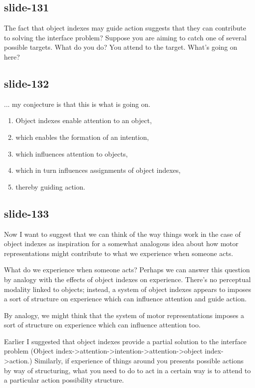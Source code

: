 \documentclass[12pt,\papersize]{extarticle}
\begin{document}
\subsection{slide-131}
The fact that object indexes may guide action suggests that they
can contribute to solving
the interface problem?
Suppose you are aiming to catch one of
several possible targets. What do you do? You attend to the target.
What’s going on here?
 
\subsection{slide-132}
... my conjecture is that this is what is going on.
\begin{enumerate}
\item Object indexes enable attention to an object,
\item which enables the formation of an intention,
\item which influences attention to objects,
\item which in turn influences assignments of object indexes,
\item thereby guiding action.
\end{enumerate}
 
\subsection{slide-133}
Now I want to suggest that we can think of the way things work in the case of
object indexes as inspiration for a somewhat analogous idea about how motor representations
might contribute to what we experience when someone acts.
 
What do we experience when someone acts?
Perhaps we can answer this question by analogy with the effects of object indexes on experience.
There’s no perceptual modality linked to objects; instead, a system of object indexes appears to
imposes a sort of structure on experience which can influence attention and guide action.
 
By analogy, we might think that the system of motor representations imposes a sort of structure
on experience which can influence attention too.
 
Earlier I suggested that object indexes provide a partial solution to the interface problem
(Object index->attention->intention->attention->object index->action.)
Similarly, if experience of things around you presents possible actions by way of
structuring, what you need to do to act in a certain way is to attend to a particular action
possibility structure.
 
\end{document}

